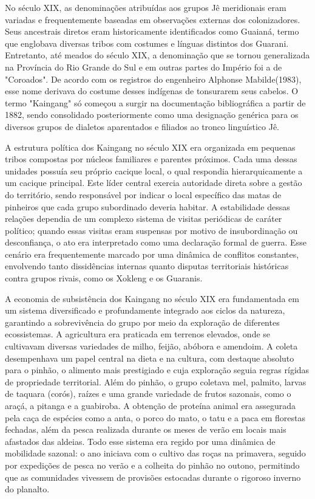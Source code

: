\documentclass[12pt, a4paper]{article}
\begin{document}
No século XIX, as denominações atribuídas aos grupos Jê meridionais eram variadas e frequentemente baseadas em observações externas dos colonizadores. Seus ancestrais diretos eram historicamente identificados como Guaianá, termo que englobava diversas tribos com costumes e línguas distintos dos Guarani. Entretanto, até meados do século XIX, a denominação que se tornou generalizada na Província do Rio Grande do Sul e em outras partes do Império foi a de "Coroados". De acordo com os registros do engenheiro Alphonse Mabilde(1983), esse nome derivava do costume desses indígenas de tonsurarem seus cabelos. O termo "Kaingang" só começou a surgir na documentação bibliográfica a partir de 1882, sendo consolidado posteriormente como uma designação genérica para os diversos grupos de dialetos aparentados e filiados ao tronco linguístico Jê.

A estrutura política dos Kaingang no século XIX era organizada em pequenas tribos compostas por núcleos familiares e parentes próximos. Cada uma dessas unidades possuía seu próprio cacique local, o qual respondia hierarquicamente a um cacique principal. Este líder central exercia autoridade direta sobre a gestão do território, sendo responsável por indicar o local específico das matas de pinheiros que cada grupo subordinado deveria habitar. A estabilidade dessas relações dependia de um complexo sistema de visitas periódicas de caráter político; quando essas visitas eram suspensas por motivo de insubordinação ou desconfiança, o ato era interpretado como uma declaração formal de guerra. Esse cenário era frequentemente marcado por uma dinâmica de conflitos constantes, envolvendo tanto dissidências internas quanto disputas territoriais históricas contra grupos rivais, como os Xokleng e os Guaranis.

A economia de subsistência dos Kaingang no século XIX era fundamentada em um sistema diversificado e profundamente integrado aos ciclos da natureza, garantindo a sobrevivência do grupo por meio da exploração de diferentes ecossistemas. A agricultura era praticada em terrenos elevados, onde se cultivavam diversas variedades de milho, feijão, abóbora e amendoim. A coleta desempenhava um papel central na dieta e na cultura, com destaque absoluto para o pinhão, o alimento mais prestigiado e cuja exploração seguia regras rígidas de propriedade territorial. Além do pinhão, o grupo coletava mel, palmito, larvas de taquara (corós), raízes e uma grande variedade de frutos sazonais, como o araçá, a pitanga e a guabiroba. A obtenção de proteína animal era assegurada pela caça de espécies como a anta, o porco do mato, o tatu e a paca em florestas fechadas, além da pesca realizada durante os meses de verão em locais mais afastados das aldeias. Todo esse sistema era regido por uma dinâmica de mobilidade sazonal: o ano iniciava com o cultivo das roças na primavera, seguido por expedições de pesca no verão e a colheita do pinhão no outono, permitindo que as comunidades vivessem de provisões estocadas durante o rigoroso inverno do planalto.
\end{document}

